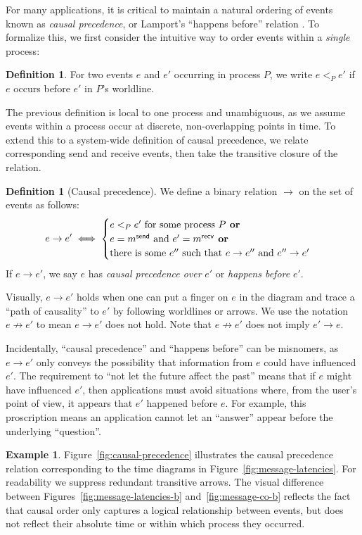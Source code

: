 \documentclass[]             %
{NASA}                       %
\theoremstyle{definition}
\newtheorem{example}[theorem]{Example}
\newtheorem{definition}[theorem]{Definition}
\begin{document}
For many applications, it is critical to maintain a natural ordering
of events known as \emph{causal precedence}, or Lamport's ``happens
before'' relation \cite{1978:lamportclocks}. To formalize this, we
first consider the intuitive way to order events within a
\emph{single} process:
\begin{definition}
  For two events $e$ and $e'$ occurring in process $P$, we
  write $e <_{P} e'$ if $e$ occurs before $e'$ in $P$'s
  worldline.
\end{definition}
The previous definition is local to one process and unambiguous, as we
assume events within a process occur at discrete, non-overlapping
points in time. To extend this to a system-wide definition of causal
precedence, we relate corresponding send and receive events, then take
the transitive closure of the relation.

\begin{definition}[Causal precedence]
  \label{def:causalprecedence}
  We define a binary relation $\to$ on the set of events as follows:
  \[e \to e' \iff
  \begin{cases}
    e <_{P} e' \textrm{ for some process $P$}
    \textbf{ or} \\
    e = m_{}^{\mathsf{send}} \textrm{ and } e' =m_{}^{\mathsf{recv}}
    \textbf{ or} \\
    \textrm{there is some } e'' \textrm{ such that } e \to e'' \textrm{ and } e'' \to e'
  \end{cases}
  \]
  If $e \to e'$, we say $e$ has \emph{causal precedence over} $e'$ or
  \emph{happens before} $e'$.
\end{definition}
Visually, $e \to e'$ holds when one can put a finger on $e$ in the
diagram and trace a ``path of causality'' to $e'$ by following
worldlines or arrows. We use the notation $e \not \to e'$ to mean
$e \to e'$ does not hold. Note that $e \not \to e'$ does not imply
$e' \to e$.

Incidentally, ``causal precedence'' and ``happens before'' can be
misnomers, as $e \to e'$ only conveys the possibility that information
from $e$ could have influenced $e'$. The requirement to ``not let the
future affect the past'' means that if $e$ might have influenced $e'$,
then applications must avoid situations where, from the user's point
of view, it appears that $e'$ happened before $e$. For example, this
proscription means an application cannot let an ``answer'' appear
before the underlying ``question''.

\begin{example}
  Figure~\ref{fig:causal-precedence} illustrates the causal precedence
  relation corresponding to the time diagrams in
  Figure~\ref{fig:message-latencies}. For readability we suppress
  redundant transitive arrows. The visual difference between
  Figures~\ref{fig:message-latencies-b} and~\ref{fig:message-co-b}
  reflects the fact that causal order only captures a logical
  relationship between events, but does not reflect their absolute
  time or within which process they occurred.
\end{example}
\end{document}
